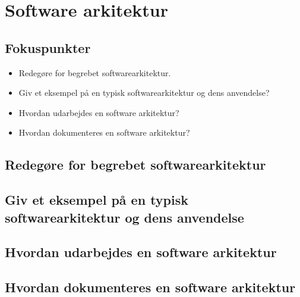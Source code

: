 \section{Software arkitektur}

\subsection{Fokuspunkter}

\begin{itemize}
	\item Redegøre for begrebet softwarearkitektur.
	\item Giv et eksempel på en typisk softwarearkitektur og dens anvendelse?
	\item Hvordan udarbejdes en software arkitektur?
	\item Hvordan dokumenteres en software arkitektur?
\end{itemize}

\subsection{Redegøre for begrebet softwarearkitektur}

\subsection{Giv et eksempel på en typisk softwarearkitektur og dens anvendelse}

\subsection{Hvordan udarbejdes en software arkitektur}

\subsection{Hvordan dokumenteres en software arkitektur}
